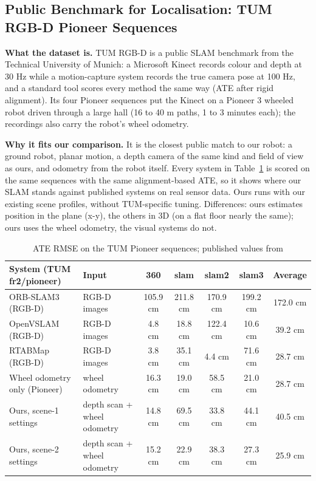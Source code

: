 \documentclass[11pt, a4paper]{article}
\begin{document}
\subsection{Public Benchmark for Localisation: TUM RGB-D Pioneer Sequences}
\noindent
\textbf{What the dataset is.} TUM RGB-D \cite{sturm2012} is a public SLAM benchmark from the Technical University of Munich: a Microsoft Kinect records colour and depth at 30 Hz while a motion-capture system records the true camera pose at 100 Hz, and a standard tool scores every method the same way (ATE after rigid alignment). Its four Pioneer sequences put the Kinect on a Pioneer 3 wheeled robot driven through a large hall (16 to 40 m paths, 1 to 3 minutes each); the recordings also carry the robot's wheel odometry.

\noindent
\textbf{Why it fits our comparison.} It is the closest public match to our robot: a ground robot, planar motion, a depth camera of the same kind and field of view as ours, and odometry from the robot itself. Every system in Table~\ref{tab:tum} is scored on the same sequences with the same alignment-based ATE, so it shows where our SLAM stands against published systems on real sensor data. Ours runs with our existing scene profiles, without TUM-specific tuning. Differences: ours estimates position in the plane (x-y), the others in 3D (on a flat floor nearly the same); ours uses the wheel odometry, the visual systems do not.

\begin{table}[H]
    \centering
    \footnotesize
    \renewcommand{\arraystretch}{1.2}
    \begin{tabular}{|p{3.6cm}|p{2.9cm}|c|c|c|c|c|}
        \hline
        \textbf{System (TUM fr2/pioneer)} & \textbf{Input} & \textbf{360} & \textbf{slam} & \textbf{slam2} & \textbf{slam3} & \textbf{Average} \\
        \hline
        ORB-SLAM3 (RGB-D) \cite{merzlyakov2021} & RGB-D images & 105.9 cm & 211.8 cm & 170.9 cm & 199.2 cm & 172.0 cm \\
        \hline
        OpenVSLAM (RGB-D) \cite{merzlyakov2021} & RGB-D images & 4.8 cm & 18.8 cm & 122.4 cm & 10.6 cm & 39.2 cm \\
        \hline
        RTABMap (RGB-D) \cite{merzlyakov2021} & RGB-D images & 3.8 cm & 35.1 cm & 4.4 cm & 71.6 cm & 28.7 cm \\
        \hline
        Wheel odometry only (Pioneer) & wheel odometry & 16.3 cm & 19.0 cm & 58.5 cm & 21.0 cm & 28.7 cm \\
        \hline
        Ours, scene-1 settings & depth scan + wheel odometry & 14.8 cm & 69.5 cm & 33.8 cm & 44.1 cm & 40.5 cm \\
        \hline
        Ours, scene-2 settings & depth scan + wheel odometry & 15.2 cm & 22.9 cm & 38.3 cm & 27.3 cm & 25.9 cm \\
        \hline
    \end{tabular}
    \caption{ATE RMSE on the TUM Pioneer sequences; published values from \cite{merzlyakov2021}}
    \label{tab:tum}
\end{table}
\end{document}
